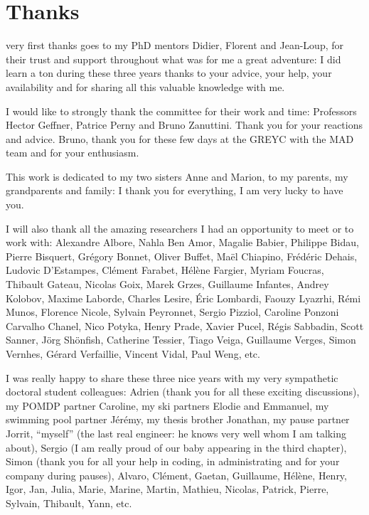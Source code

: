 \chapter*{Thanks}
\vspace{-2cm}
 very first thanks goes to my PhD mentors Didier, Florent and Jean-Loup,
for their trust and support throughout what was for me a great adventure:
I did learn a ton during these three years thanks to your advice, 
your help, 
your availability 
and for sharing all this valuable knowledge with me.

I would like to strongly thank the committee for their work and time: 
Professors Hector Geffner, Patrice Perny and Bruno Zanuttini.
Thank you for your reactions and advice.
Bruno, thank you for these few days at the GREYC with the MAD team
and for your enthusiasm.

This work is dedicated to my two sisters Anne and Marion, 
to my parents, my grandparents and family: 
I thank you for everything, I am very lucky to have you.

I will also thank all the amazing researchers 
I had an opportunity to meet or to work with:
Alexandre Albore,
Nahla Ben Amor,
Magalie Babier,
Philippe Bidau, 
Pierre Bisquert,
Gr\'egory Bonnet,
Oliver Buffet,
Ma\"el Chiapino,
Fr\'ed\'eric Dehais,
Ludovic D'Estampes,
Cl\'ement Farabet,
H\'el\`ene Fargier,
Myriam Foucras, 
Thibault Gateau,
Nicolas Goix,
Marek Grzes, 
Guillaume Infantes,
Andrey Kolobov,
Maxime Laborde,
Charles Lesire,
\'Eric Lombardi,
Faouzy Lyazrhi,
R\'emi Munos,
Florence Nicole,
Sylvain Peyronnet,
Sergio Pizziol,
Caroline Ponzoni Carvalho Chanel,
Nico Potyka,
Henry Prade,
Xavier Pucel,
R\'egis Sabbadin, 
Scott Sanner,
J\"org Sh\"onfish,
Catherine Tessier,
Tiago Veiga,
Guillaume Verges,
Simon Vernhes,
G\'erard Verfaillie,
Vincent Vidal,
Paul Weng, etc.






I was really happy to share these three nice years with
my very sympathetic doctoral student colleagues: 
Adrien (thank you for all these exciting discussions), 
my POMDP partner Caroline,
my ski partners Elodie and Emmanuel,
my swimming pool partner J\'er\'emy, 
my thesis brother Jonathan, 
my pause partner Jorrit, 
``myself'' (the last real engineer: he knows very well whom I am talking about), 
Sergio (I am really proud of our baby appearing in the third chapter),  
Simon (thank you for all your help in coding, in administrating and for your company during pauses), 
Alvaro, Cl\'ement, Gaetan, Guillaume, H\'el\`ene, Henry, Igor, Jan, Julia, Marie, Marine, Martin, Mathieu, Nicolas, Patrick, Pierre, Sylvain, Thibault, Yann, etc.

